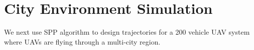 \section{City Environment Simulation \label{sec:bayArea_sim}}
We next use SPP algorithm to design trajectories for a 200 vehicle UAV system where UAVs are flying through a multi-city region.